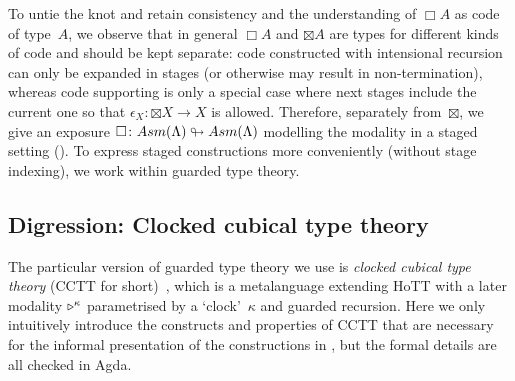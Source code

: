\documentclass[a4paper,UKenglish,numberwithinsect,cleveref,thm-restate,draft]{lipics-v2021}
\numberwithin{equation}{section}
\theoremstyle{definition}
\theoremstyle{plain}
\begin{document}
To untie the knot and retain consistency and the understanding of $\Box A$ as code of type~$A$, we observe that in general $\Box A$ and $\boxtimes A$ are types for different kinds of code and should be kept separate: code constructed with intensional recursion can only be expanded in stages (or otherwise may result in non-termination), whereas code supporting \SFour is only a special case where next stages include the current one so that $\epsilon_X\colon {\boxtimes} X \to X$ is allowed.
Therefore, separately from~$\boxtimes$, we give an exposure $\Box \colon \Asm(\Lambda) \looparrowright \Asm(\Lambda)$ modelling the \GL modality in a staged setting ().
To express staged constructions more conveniently (without stage indexing), we work within guarded type theory.

\subsection{Digression: Clocked cubical type theory}

The particular version of guarded type theory we use is \emph{clocked cubical type theory} (CCTT for short)~\cite{Kristensen2021}, which is a metalanguage extending HoTT with a later modality $\mathord{\triangleright}^\kappa$ parametrised by a `clock'~$\kappa$ and guarded recursion.
Here we only intuitively introduce the constructs and properties of CCTT that are necessary for the informal presentation of the constructions in , but the formal details are all checked in Agda.

\end{document}
